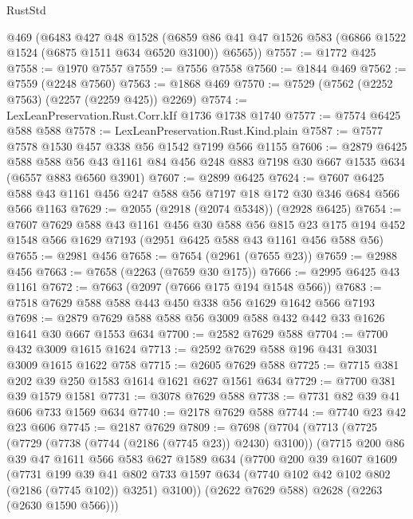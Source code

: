 \begin{lexlean}{RustStd}
\begin{coremodule}
    @469
    (@6483
      @427
      @48
      @1528
      (@6859 @86 @41 @47 @1526 @583 (@6866 @1522 @1524 (@6875 @1511 @634 @6520 @3100)) @6565))
@7557 := @1772 @425
@7558 := @1970 @7557
@7559 := @7556 @7558
@7560 := @1844 @469
@7562 := @7559 (@2248 @7560)
@7563 := @1868 @469
@7570 := @7529 (@7562 (@2252 @7563) (@2257 (@2259 @425)) @2269)
@7574 := LexLeanPreservation.Rust.Corr.kIf @1736 @1738 @1740
@7577 := @7574 @6425 @588 @588
@7578 := LexLeanPreservation.Rust.Kind.plain
@7587 := @7577 @7578 @1530 @457 @338 @56 @1542 @7199 @566 @1155
@7606 := @2879
    @6425
    @588
    @588
    @56
    @43
    @1161
    @84
    @456
    @248
    @883
    @7198
    @30
    @667
    @1535
    @634
    (@6557 @883 @6560 @3901)
@7607 := @2899 @6425
@7624 := @7607 @6425 @588 @43 @1161 @456 @247 @588 @56 @7197 @18 @172 @30 @346 @684 @566 @566 @1163
@7629 := @2055 (@2918 (@2074 @5348)) (@2928 @6425)
@7654 := @7607
    @7629
    @588
    @43
    @1161
    @456
    @30
    @588
    @56
    @815
    @23
    @175
    @194
    @452
    @1548
    @566
    @1629
    @7193
    (@2951 @6425 @588 @43 @1161 @456 @588 @56)
@7655 := @2981 @456
@7658 := @7654 (@2961 (@7655 @23))
@7659 := @2988 @456
@7663 := @7658 (@2263 (@7659 @30 @175))
@7666 := @2995 @6425 @43 @1161
@7672 := @7663 (@2097 (@7666 @175 @194 @1548 @566))
@7683 := @7518 @7629 @588 @588 @443 @450 @338 @56 @1629 @1642 @566 @7193
@7698 := @2879 @7629 @588 @588 @56 @3009 @588 @432 @442 @33 @1626 @1641 @30 @667 @1553 @634
@7700 := @2582 @7629 @588
@7704 := @7700 @432 @3009 @1615 @1624
@7713 := @2592 @7629 @588 @196 @431 @3031 @3009 @1615 @1622 @758
@7715 := @2605 @7629 @588
@7725 := @7715 @381 @202 @39 @250 @1583 @1614 @1621 @627 @1561 @634
@7729 := @7700 @381 @39 @1579 @1581
@7731 := @3078 @7629 @588
@7738 := @7731 @82 @39 @41 @606 @733 @1569 @634
@7740 := @2178 @7629 @588
@7744 := @7740 @23 @42 @23 @606
@7745 := @2187 @7629
@7809 := @7698
    (@7704
      (@7713
        (@7725
          (@7729 (@7738 (@7744 (@2186 (@7745 @23)) @2430) @3100))
          (@7715
            @200
            @86
            @39
            @47
            @1611
            @566
            @583
            @627
            @1589
            @634
            (@7700
              @200
              @39
              @1607
              @1609
              (@7731
                @199
                @39
                @41
                @802
                @733
                @1597
                @634
                (@7740 @102 @42 @102 @802 (@2186 (@7745 @102)) @3251)
                @3100))
            (@2622 @7629 @588)
            @2628
            (@2263 (@2630 @1590 @566)))

\end{coremodule}
\end{lexlean}
